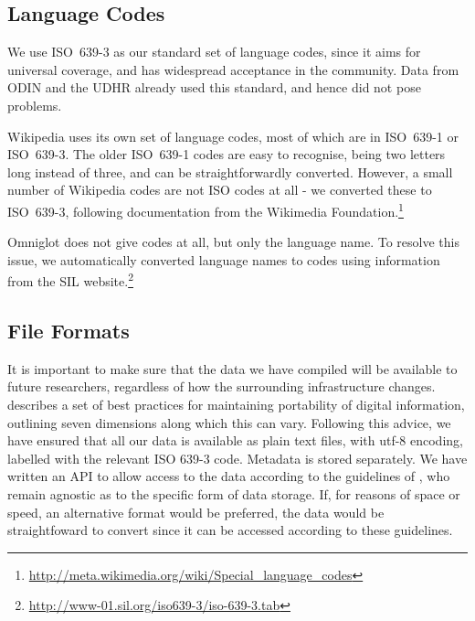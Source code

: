 
\subsection{Language Codes}
We use ISO~639-3 as our standard set of language codes, since it aims for universal coverage, and has widespread acceptance in the community. %
Data from ODIN and the UDHR already used this standard, and hence did not pose problems.

Wikipedia uses its own set of language codes, most of which are in ISO~639-1 or ISO~639-3.  The older ISO~639-1 codes are easy to recognise, being two letters long instead of three, and can be straightforwardly converted.  However, a small number of Wikipedia codes are not ISO codes at all - we converted these to ISO~639-3, following documentation from the Wikimedia Foundation.\footnote{\url{http://meta.wikimedia.org/wiki/Special\_language\_codes}}

Omniglot does not give codes at all, but only the language name. To resolve this issue, we automatically converted language names to codes using information from the SIL website.\footnote{\url{http://www-01.sil.org/iso639-3/iso-639-3.tab}}



\subsection{File Formats}

It is important to make sure that the data we have compiled will be available to future researchers, regardless of how the surrounding infrastructure changes.  describes a set of best practices for maintaining portability of digital information, outlining seven dimensions along which this can vary. Following this advice, we have ensured that all our data is available as plain text files, with utf-8 encoding, labelled with the relevant ISO 639-3 code. Metadata is stored separately. We have written an API to allow access to the data according to the guidelines of , who remain agnostic as to the specific form of data storage. If, for reasons of space or speed, an alternative format would be preferred, the data would be straightfoward to convert since it can be accessed according to these guidelines.
